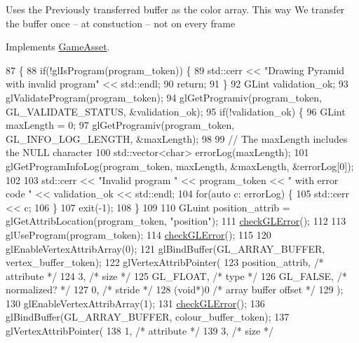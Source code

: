 Uses the Previously transferred buffer as the color array. This way We transfer the buffer once -- at constuction -- not on every frame

Implements \hyperlink{classGameAsset_a961aa51ca0a9961fc584c0b5d5431300}{Game\+Asset}.


\begin{DoxyCode}
87                                             \{
88   \textcolor{keywordflow}{if}(!glIsProgram(program\_token)) \{
89     std::cerr << \textcolor{stringliteral}{"Drawing Pyramid with invalid program"} << std::endl;
90     \textcolor{keywordflow}{return};
91   \}
92   GLint validation\_ok;
93   glValidateProgram(program\_token);
94   glGetProgramiv(program\_token, GL\_VALIDATE\_STATUS, &validation\_ok);
95   \textcolor{keywordflow}{if}(!validation\_ok) \{
96     GLint maxLength = 0;
97     glGetProgramiv(program\_token, GL\_INFO\_LOG\_LENGTH, &maxLength);
98 
99     \textcolor{comment}{// The maxLength includes the NULL character}
100     std::vector<char> errorLog(maxLength);
101     glGetProgramInfoLog(program\_token, maxLength, &maxLength, &errorLog[0]);
102 
103     std::cerr << \textcolor{stringliteral}{"Invalid program "} << program\_token << \textcolor{stringliteral}{" with error code "} << validation\_ok << std::endl;
104     \textcolor{keywordflow}{for}(\textcolor{keyword}{auto} c: errorLog) \{
105       std::cerr << c;
106     \}
107     exit(-1);
108   \}
109 
110   GLuint position\_attrib = glGetAttribLocation(program\_token, \textcolor{stringliteral}{"position"});
111   \hyperlink{PyramidAsset_8cc_a75f201b0e53e68726854997957322b8d}{checkGLError}();
112 
113   glUseProgram(program\_token);
114   \hyperlink{PyramidAsset_8cc_a75f201b0e53e68726854997957322b8d}{checkGLError}();
115 
120   glEnableVertexAttribArray(0);
121   glBindBuffer(GL\_ARRAY\_BUFFER, vertex\_buffer\_token);
122   glVertexAttribPointer(
123     position\_attrib,        \textcolor{comment}{/* attribute */}
124     3,        \textcolor{comment}{/* size */}
125     GL\_FLOAT,   \textcolor{comment}{/* type */}
126     GL\_FALSE,   \textcolor{comment}{/* normalized? */}
127     0,        \textcolor{comment}{/* stride */}
128     (\textcolor{keywordtype}{void}*)0    \textcolor{comment}{/* array buffer offset */}
129   );
130   glEnableVertexAttribArray(1);
131   \hyperlink{PyramidAsset_8cc_a75f201b0e53e68726854997957322b8d}{checkGLError}();
136   glBindBuffer(GL\_ARRAY\_BUFFER, colour\_buffer\_token);
137   glVertexAttribPointer(
138     1,        \textcolor{comment}{/* attribute */}
139     3,        \textcolor{comment}{/* size */}

\end{DoxyCode}
